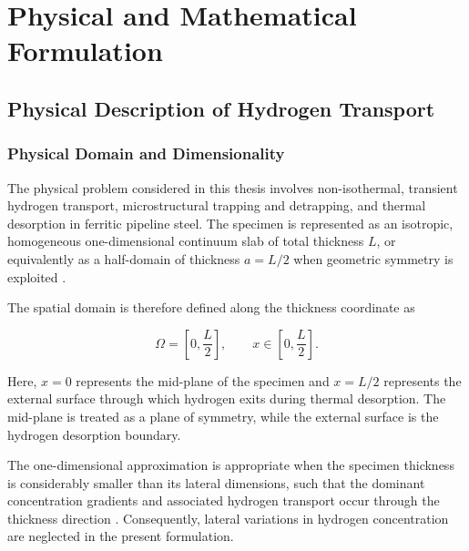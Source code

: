 \chapter{Physical and Mathematical Formulation}
\label{chap:physical_mathematical_formulation}

\section{Physical Description of Hydrogen Transport}
\label{sec:physical_description}

\subsection{Physical Domain and Dimensionality}
\label{subsec:physical_domain}

The physical problem considered in this thesis involves non-isothermal,
transient hydrogen transport, microstructural trapping and detrapping,
and thermal desorption in ferritic pipeline steel. The specimen is
represented as an isotropic, homogeneous one-dimensional continuum slab
of total thickness $L$, or equivalently as a half-domain of thickness
$a=L/2$ when geometric symmetry is exploited
\cite{Turnbull1997,Legrand2015,Diaz2020,Marrani2025}.

The spatial domain is therefore defined along the thickness coordinate as

\begin{equation}
\Omega = \left[0,\frac{L}{2}\right],
\qquad
x \in \left[0,\frac{L}{2}\right].
\label{eq:ch3_domain}
\end{equation}

Here, $x=0$ represents the mid-plane of the specimen and
$x=L/2$ represents the external surface through which hydrogen exits
during thermal desorption. The mid-plane is treated as a plane of
symmetry, while the external surface is the hydrogen desorption
boundary.

The one-dimensional approximation is appropriate when the specimen
thickness is considerably smaller than its lateral dimensions, such
that the dominant concentration gradients and associated hydrogen
transport occur through the thickness direction
\cite{Turnbull1997,Legrand2015,Marrani2025}. Consequently, lateral
variations in hydrogen concentration are neglected in the present
formulation.


